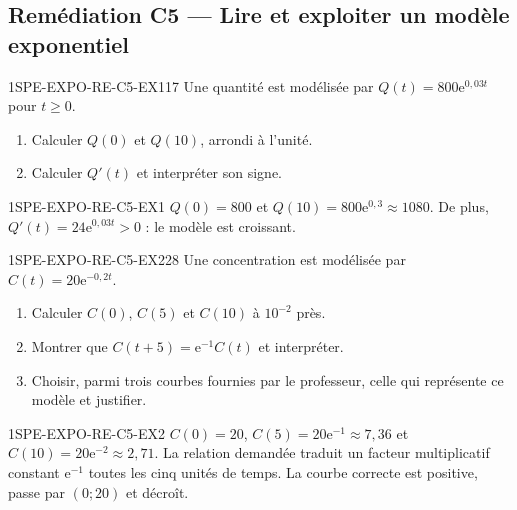 
\subsection*{Remédiation C5 — Lire et exploiter un modèle exponentiel}

\begin{exercice}{1SPE-EXPO-RE-C5-EX1}{1}{7}
Une quantité est modélisée par $Q(t)=800\mathrm{e}^{0{,}03t}$ pour $t\geqslant0$.
\begin{enumerate}
\item Calculer $Q(0)$ et $Q(10)$, arrondi à l'unité.
\item Calculer $Q'(t)$ et interpréter son signe.
\end{enumerate}
\end{exercice}
\begin{corrige}{1SPE-EXPO-RE-C5-EX1}
$Q(0)=800$ et $Q(10)=800\mathrm{e}^{0{,}3}\approx1080$. De plus, $Q'(t)=24\mathrm{e}^{0{,}03t}>0$ : le modèle est croissant.
\end{corrige}

\begin{exercice}{1SPE-EXPO-RE-C5-EX2}{2}{8}
Une concentration est modélisée par $C(t)=20\mathrm{e}^{-0{,}2t}$.
\begin{enumerate}
\item Calculer $C(0)$, $C(5)$ et $C(10)$ à $10^{-2}$ près.
\item Montrer que $C(t+5)=\mathrm{e}^{-1}C(t)$ et interpréter.
\item Choisir, parmi trois courbes fournies par le professeur, celle qui représente ce modèle et justifier.
\end{enumerate}
\end{exercice}
\begin{corrige}{1SPE-EXPO-RE-C5-EX2}
$C(0)=20$, $C(5)=20\mathrm{e}^{-1}\approx7{,}36$ et $C(10)=20\mathrm{e}^{-2}\approx2{,}71$. La relation demandée traduit un facteur multiplicatif constant $\mathrm{e}^{-1}$ toutes les cinq unités de temps. La courbe correcte est positive, passe par $(0;20)$ et décroît.
\end{corrige}

